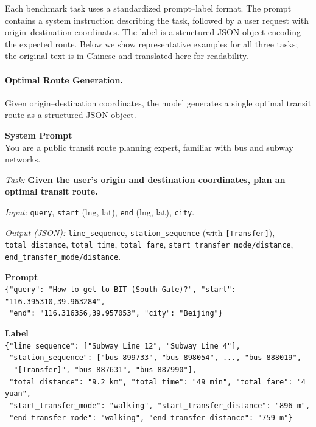 \documentclass{article}
\begin{document}
Each benchmark task uses a standardized prompt--label format. The prompt contains a system instruction describing the task, followed by a user request with origin--destination coordinates. The label is a structured JSON object encoding the expected route. Below we show representative examples for all three tasks; the original text is in Chinese and translated here for readability.

\paragraph{Optimal Route Generation.}
Given origin--destination coordinates, the model generates a single optimal transit route as a structured JSON object.
\begin{tcolorbox}[colback=gray!3, colframe=black!40, boxrule=0.4pt, arc=2pt, left=6pt, right=6pt, top=4pt, bottom=4pt, fontupper=\small, fontlower=\small, breakable, title={\small\textbf{Prompt \& Label}}]
\textbf{System Prompt} \\[2pt]
You are a public transit route planning expert, familiar with bus and subway networks.

\textit{Task:} \textbf{Given the user's origin and destination coordinates, plan an optimal transit route.}

\textit{Input:} \texttt{query}, \texttt{start} (lng, lat), \texttt{end} (lng, lat), \texttt{city}.

\textit{Output (JSON):} \texttt{line\_sequence}, \texttt{station\_sequence} (with \texttt{[Transfer]}), \texttt{total\_distance}, \texttt{total\_time}, \texttt{total\_fare}, \texttt{start\_transfer\_mode/distance}, \texttt{end\_transfer\_mode/distance}.

\tcblower

\textbf{Prompt} \\[2pt]
\texttt{\{"query": "How to get to BIT (South Gate)?", "start": "116.395310,39.963284",} \\
\texttt{~"end": "116.316356,39.957053", "city": "Beijing"\}}

\vspace{6pt}
\textbf{Label} \\[2pt]
\texttt{\{"line\_sequence": ["Subway Line 12", "Subway Line 4"],} \\
\texttt{~"station\_sequence": ["bus-899733", "bus-898054", ..., "bus-888019",} \\
\texttt{~~"[Transfer]", "bus-887631", "bus-887990"],} \\
\texttt{~"total\_distance": "9.2 km", "total\_time": "49 min", "total\_fare": "4 yuan",} \\
\texttt{~"start\_transfer\_mode": "walking", "start\_transfer\_distance": "896 m",} \\
\texttt{~"end\_transfer\_mode": "walking", "end\_transfer\_distance": "759 m"\}}
\end{tcolorbox}
\end{document}
